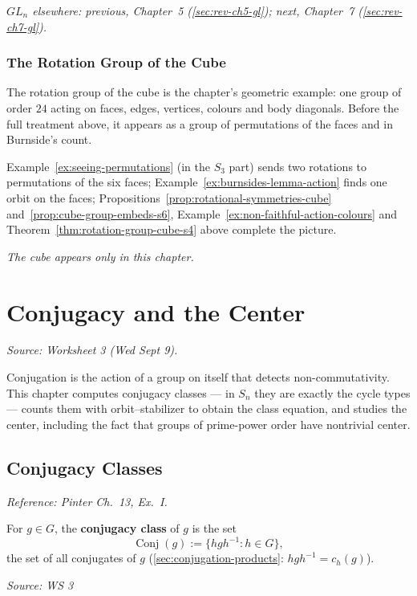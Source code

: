 \documentclass[11pt]{report}
\newcommand{\srcline}[1]{\par\hfill{\footnotesize\textit{Source: #1}}}
\begin{document}
\textit{$GL_n$ elsewhere: previous, Chapter~5 (\ref{sec:rev-ch5-gl}); next, Chapter~7 (\ref{sec:rev-ch7-gl}).}

\subsection{The Rotation Group of the Cube}\label{sec:rev-ch6-cube}

The rotation group of the cube is the chapter's geometric example: one group of order $24$ acting on faces, edges, vertices, colours and body diagonals. Before the full treatment above, it appears as a group of permutations of the faces and in Burnside's count.

Example~\ref{ex:seeing-permutations} (in the $S_3$ part) sends two rotations to permutations of the six faces; Example~\ref{ex:burnsides-lemma-action} finds one orbit on the faces; Propositions~\ref{prop:rotational-symmetries-cube} and~\ref{prop:cube-group-embeds-s6}, Example~\ref{ex:non-faithful-action-colours} and Theorem~\ref{thm:rotation-group-cube-s4} above complete the picture.

\textit{The cube appears only in this chapter.}


\chapter{Conjugacy and the Center}\label{ch:conjugacy}


\textit{Source: Worksheet 3 (Wed Sept 9).}

Conjugation is the action of a group on itself that detects non-commutativity. This chapter computes conjugacy classes --- in $S_n$ they are exactly the cycle types --- counts them with orbit--stabilizer to obtain the class equation, and studies the center, including the fact that groups of prime-power order have nontrivial center.


\section{Conjugacy Classes}\label{sec:conjugacy}

\textit{Reference: Pinter Ch.\ 13, Ex.\ I.}

\begin{defbox}\label{def:conjugacy-class}
For $g \in G$, the \textbf{conjugacy class} of $g$ is the set
\[ \operatorname{Conj}(g) := \{ h g h^{-1} : h \in G \}, \]
the set of all conjugates of $g$ (\ref{sec:conjugation-products}: $hgh^{-1} = c_h(g)$).
\srcline{WS 3}
\end{defbox}
\end{document}
